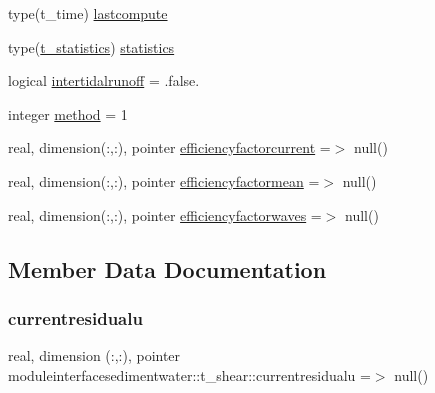 \begin{DoxyCompactItemize}
\item 
type(t\+\_\+time) \mbox{\hyperlink{structmoduleinterfacesedimentwater_1_1t__shear_aa9af12e72272ec647e10f1ae43fa8b34}{lastcompute}}
\item 
type(\mbox{\hyperlink{structmoduleinterfacesedimentwater_1_1t__statistics}{t\+\_\+statistics}}) \mbox{\hyperlink{structmoduleinterfacesedimentwater_1_1t__shear_a92e5ff961021739718c446dad0baa69e}{statistics}}
\item 
logical \mbox{\hyperlink{structmoduleinterfacesedimentwater_1_1t__shear_a8e73d826c747195cb72cbb8e5014dcc7}{intertidalrunoff}} = .false.
\item 
integer \mbox{\hyperlink{structmoduleinterfacesedimentwater_1_1t__shear_af0bdff1dec5b3f07da955bbae2e92bec}{method}} = 1
\item 
real, dimension(\+:,\+:), pointer \mbox{\hyperlink{structmoduleinterfacesedimentwater_1_1t__shear_a74c9b7fcb89a2fb983173cacd8f7b7a7}{efficiencyfactorcurrent}} =$>$ null()
\item 
real, dimension(\+:,\+:), pointer \mbox{\hyperlink{structmoduleinterfacesedimentwater_1_1t__shear_ab616e13e605d375beeb8cc48f1c1d6ad}{efficiencyfactormean}} =$>$ null()
\item 
real, dimension(\+:,\+:), pointer \mbox{\hyperlink{structmoduleinterfacesedimentwater_1_1t__shear_ab8a8006f82bb07166ee54193a89eb224}{efficiencyfactorwaves}} =$>$ null()
\end{DoxyCompactItemize}


\subsection{Member Data Documentation}
\mbox{\label{structmoduleinterfacesedimentwater_1_1t__shear_acd2060c8b558dc7636a7dca4f8dbded7}} 
\subsubsection{\texorpdfstring{currentresidualu}{currentresidualu}}
{\footnotesize\ttfamily real, dimension (\+:,\+:), pointer moduleinterfacesedimentwater\+::t\+\_\+shear\+::currentresidualu =$>$ null()\hspace{0.3cm}{\ttfamily [private]}}


